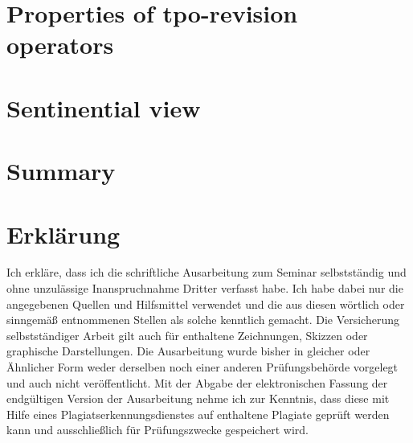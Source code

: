 \documentclass[11pt]{scrartcl}
\theoremstyle{definition}
\theoremstyle{definition}
\begin{document}
\section{Properties of tpo-revision operators}

\section{Sentinential view}

\section{Summary}

\newpage

\typeout{}



\newpage

\section*{Erklärung}
Ich erkläre, dass ich die schriftliche Ausarbeitung zum Seminar selbstständig und ohne unzulässige Inanspruchnahme Dritter verfasst habe. Ich habe dabei nur die angegebenen Quellen und Hilfsmittel verwendet und die aus diesen wörtlich oder sinngemäß entnommenen Stellen als solche kenntlich gemacht. Die Versicherung selbstständiger Arbeit gilt auch für enthaltene Zeichnungen, Skizzen oder graphische Darstellungen. Die Ausarbeitung wurde bisher in gleicher oder Ähnlicher Form weder derselben noch einer anderen Prüfungsbehörde vorgelegt und auch nicht veröffentlicht. Mit der Abgabe der elektronischen Fassung der endgültigen Version der Ausarbeitung nehme ich zur Kenntnis, dass diese mit Hilfe eines Plagiatserkennungsdienstes auf enthaltene Plagiate geprüft werden kann und ausschließlich für Prüfungszwecke gespeichert wird.
\end{document}
